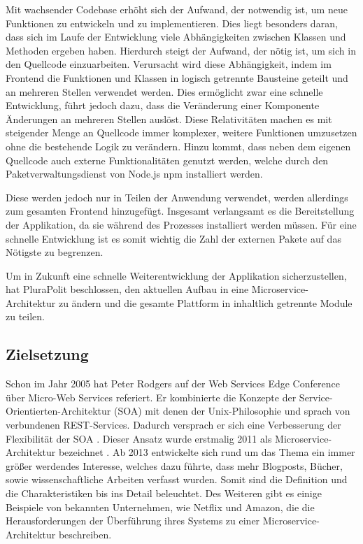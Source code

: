 Mit wachsender Codebase erhöht sich der Aufwand, der notwendig ist, um neue Funktionen zu entwickeln und zu implementieren. Dies liegt besonders daran, dass sich im Laufe der Entwicklung viele Abhängigkeiten zwischen Klassen und Methoden ergeben haben. Hierdurch steigt der Aufwand, der nötig ist, um sich in den Quellcode einzuarbeiten. Verursacht wird diese Abhängigkeit, indem im Frontend die Funktionen und Klassen in logisch getrennte Bausteine geteilt und an mehreren Stellen verwendet werden. Dies ermöglicht zwar eine schnelle Entwicklung, führt jedoch dazu, dass die Veränderung einer Komponente Änderungen an mehreren Stellen auslöst. Diese Relativitäten machen es mit steigender Menge an Quellcode immer komplexer, weitere Funktionen umzusetzen ohne die bestehende Logik zu verändern. Hinzu kommt, dass neben dem eigenen Quellcode auch externe Funktionalitäten genutzt werden, welche durch den Paketverwaltungsdienst von Node.js \parencite{nodejs} npm installiert werden.

Diese werden jedoch nur in Teilen der Anwendung verwendet, werden allerdings zum gesamten Frontend hinzugefügt. Insgesamt verlangsamt es die Bereitstellung der Applikation, da sie während des Prozesses installiert werden müssen. Für eine schnelle Entwicklung ist es somit wichtig die Zahl der externen Pakete auf das Nötigste zu begrenzen.

Um in Zukunft eine schnelle Weiterentwicklung der Applikation sicherzustellen, hat PluraPolit beschlossen, den aktuellen Aufbau in eine Microservice-Architektur zu ändern und die gesamte Plattform in inhaltlich getrennte Module zu teilen.

\subsection{Zielsetzung}
\label{sec:zielsetzung}

Schon im Jahr 2005 hat Peter Rodgers auf der Web Services Edge Conference über Micro-Web Services referiert. Er kombinierte die Konzepte der Service-Orientierten-Architektur (SOA) mit denen der Unix-Philosophie und sprach von verbundenen REST-Services. Dadurch versprach er sich eine Verbesserung der Flexibilität der SOA \parencite[vgl.][]{rodgers_peter}. Dieser Ansatz wurde erstmalig 2011 als Microservice-Architektur bezeichnet \parencite[vgl.][]{dragoni_microservices_2017}. Ab 2013 entwickelte sich rund um das Thema ein immer größer werdendes Interesse, welches dazu führte, dass mehr Blogposts, Bücher, sowie wissenschaftliche Arbeiten verfasst wurden. Somit sind die Definition und die Charakteristiken bis ins Detail beleuchtet. Des Weiteren gibt es einige Beispiele von bekannten Unternehmen, wie Netflix und Amazon, die die Herausforderungen der Überführung ihres Systems zu einer Microservice-Architektur beschreiben.


